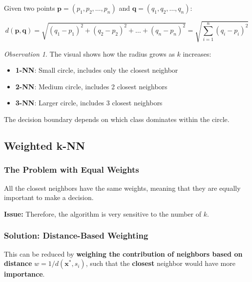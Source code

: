 \documentclass[11pt,a4paper]{article}
\theoremstyle{definition}
\theoremstyle{plain}
\theoremstyle{remark}
\newtheorem*{observation}{Observation}
\begin{document}
\begin{tcolorbox}[colback=blue!5!white,colframe=blue!75!black,title=\textbf{Euclidean Distance Formula}]
Given two points $\mathbf{p} = (p_1, p_2, \ldots, p_n)$ and $\mathbf{q} = (q_1, q_2, \ldots, q_n)$:

\[
d(\mathbf{p}, \mathbf{q}) = \sqrt{(q_1 - p_1)^2 + (q_2 - p_2)^2 + \ldots + (q_n - p_n)^2} = \sqrt{\sum_{i=1}^{n} (q_i - p_i)^2}
\]
\end{tcolorbox}

\begin{observation}
The visual shows how the radius grows as $k$ increases:
\begin{itemize}
    \item \textbf{1-NN}: Small circle, includes only the closest neighbor
    \item \textbf{2-NN}: Medium circle, includes 2 closest neighbors
    \item \textbf{3-NN}: Larger circle, includes 3 closest neighbors
\end{itemize}
The decision boundary depends on which class dominates within the circle.
\end{observation}

\subsection{Weighted k-NN}

\subsubsection{The Problem with Equal Weights}

All the closest neighbors have the same weights, meaning that they are equally important to make a decision.

\begin{center}
\colorbox{red!15}{\parbox{0.9\textwidth}{
\textbf{Issue:} Therefore, the algorithm is very sensitive to the number of $k$.
}}
\end{center}

\subsubsection{Solution: Distance-Based Weighting}

This can be reduced by \textbf{weighing the contribution of neighbors based on distance} $w = 1/d(\mathbf{x}^*, s_i)$, such that the \textbf{closest} neighbor would have more \textbf{importance}.
\end{document}
